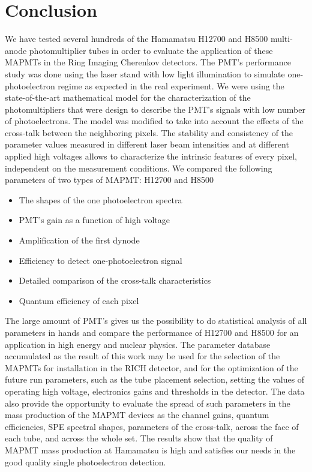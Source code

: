 \section{Conclusion}
We have tested several hundreds of the Hamamatsu H12700 and H8500 multi-anode photomultiplier tubes in order to evaluate the application of these MAPMTs in the Ring Imaging Cherenkov detectors. The PMT’s performance study was done using the laser stand with low light illumination to simulate one-photoelectron regime as expected in the real experiment. We were using the state-of-the-art mathematical model for the characterization of the photomultipliers that were design to describe the PMT’s signals with low number of photoelectrons. The model was modified to take into account the effects of the cross-talk between the neighboring pixels. The stability and consistency of the parameter values measured in different laser beam intensities and at different applied high voltages allows to characterize the intrinsic features of every pixel, independent on the measurement conditions. 
We compared the following parameters of two types of MAPMT: H12700 and H8500
\begin{itemize}
\item The shapes of the one photoelectron spectra
\item PMT's gain as a function of high voltage
\item Amplification of the first dynode
\item Efficiency to detect one-photoelectron signal
\item Detailed comparison of the cross-talk characteristics
\item Quantum efficiency of each pixel
\end{itemize}
The large amount of PMT’s gives us the possibility to do statistical analysis of all parameters in hands and compare the performance of H12700 and H8500 for an application in high energy and nuclear physics. The parameter database accumulated as the result of this work may be used for the selection of the MAPMTs for installation in the RICH detector, and for the optimization of the future run parameters, such as the tube placement selection, setting the values of operating high voltage, electronics gains and thresholds in the detector. The data also provide the opportunity to evaluate the spread of such parameters in the mass production of the MAPMT devices as the channel gains, quantum efficiencies, SPE spectral shapes, parameters of the cross-talk, across the face of each tube, and across the whole set. The results show that the quality of MAPMT mass production at Hamamatsu is high and satisfies our needs in the good quality single photoelectron detection.
 
